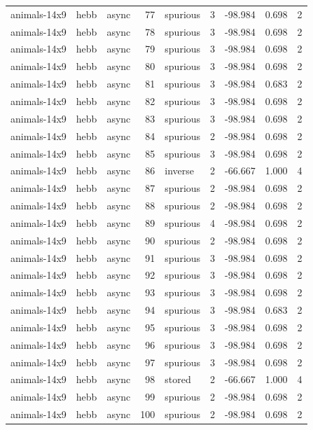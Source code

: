 \begin{tabular}{lllrlrrrr}
animals-14x9 & hebb & async & 77 & spurious & 3 & -98.984 & 0.698 & 2 \\
animals-14x9 & hebb & async & 78 & spurious & 3 & -98.984 & 0.698 & 2 \\
animals-14x9 & hebb & async & 79 & spurious & 3 & -98.984 & 0.698 & 2 \\
animals-14x9 & hebb & async & 80 & spurious & 3 & -98.984 & 0.698 & 2 \\
animals-14x9 & hebb & async & 81 & spurious & 3 & -98.984 & 0.683 & 2 \\
animals-14x9 & hebb & async & 82 & spurious & 3 & -98.984 & 0.698 & 2 \\
animals-14x9 & hebb & async & 83 & spurious & 3 & -98.984 & 0.698 & 2 \\
animals-14x9 & hebb & async & 84 & spurious & 2 & -98.984 & 0.698 & 2 \\
animals-14x9 & hebb & async & 85 & spurious & 3 & -98.984 & 0.698 & 2 \\
animals-14x9 & hebb & async & 86 & inverse & 2 & -66.667 & 1.000 & 4 \\
animals-14x9 & hebb & async & 87 & spurious & 2 & -98.984 & 0.698 & 2 \\
animals-14x9 & hebb & async & 88 & spurious & 2 & -98.984 & 0.698 & 2 \\
animals-14x9 & hebb & async & 89 & spurious & 4 & -98.984 & 0.698 & 2 \\
animals-14x9 & hebb & async & 90 & spurious & 2 & -98.984 & 0.698 & 2 \\
animals-14x9 & hebb & async & 91 & spurious & 3 & -98.984 & 0.698 & 2 \\
animals-14x9 & hebb & async & 92 & spurious & 3 & -98.984 & 0.698 & 2 \\
animals-14x9 & hebb & async & 93 & spurious & 3 & -98.984 & 0.698 & 2 \\
animals-14x9 & hebb & async & 94 & spurious & 3 & -98.984 & 0.683 & 2 \\
animals-14x9 & hebb & async & 95 & spurious & 3 & -98.984 & 0.698 & 2 \\
animals-14x9 & hebb & async & 96 & spurious & 3 & -98.984 & 0.698 & 2 \\
animals-14x9 & hebb & async & 97 & spurious & 3 & -98.984 & 0.698 & 2 \\
animals-14x9 & hebb & async & 98 & stored & 2 & -66.667 & 1.000 & 4 \\
animals-14x9 & hebb & async & 99 & spurious & 2 & -98.984 & 0.698 & 2 \\
animals-14x9 & hebb & async & 100 & spurious & 2 & -98.984 & 0.698 & 2 \\

\end{tabular}
